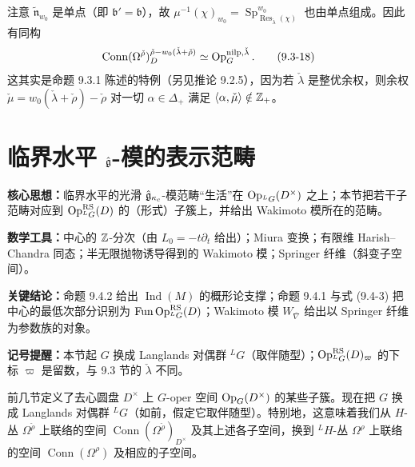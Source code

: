 注意 $\tilde{\mathfrak{n}}_{w_0}$ 是单点（即 $\mathfrak{b}'=\mathfrak{b}$），故 $\mu^{-1}(\chi)_{w_0}=\operatorname{Sp}^{w_0}_{\operatorname{Res}_{\check\lambda}(\chi)}$ 也由单点组成。因此有同构
\begin{equation}
    \operatorname{Conn}(\Omega^{\check\rho})^{\check\rho-w_0(\check\lambda+\check\rho)}_D
    \simeq\operatorname{Op}^{\mathrm{nilp},\check\lambda}_G .
    \tag{9.3-18}
\end{equation}
这其实是命题 9.3.1 陈述的特例（另见推论 9.2.5），因为若 $\check\lambda$ 是整优余权，则余权 $\check\mu=w_0(\check\lambda+\check\rho)-\check\rho$ 对一切 $\alpha\in\Delta_+$ 满足 $\langle\alpha,\check\mu\rangle\notin\mathbb{Z}_+$。


\section{临界水平 $\hat{\mathfrak{g}}$-模的表示范畴}

\begin{keypoints}
    \item \textbf{核心思想：}临界水平的光滑 $\hat{\mathfrak{g}}_{\kappa_c}$-模范畴“生活”在 $\operatorname{Op}_{{}^LG}(D^\times)$ 之上；本节把若干子范畴对应到 $\operatorname{Op}^{\mathrm{RS}}_{{}^LG}(D)$ 的（形式）子簇上，并给出 Wakimoto 模所在的范畴。
    \item \textbf{数学工具：}中心的 $\mathbb{Z}$-分次（由 $L_0=-t\partial_t$ 给出）；Miura 变换；有限维 Harish--Chandra 同态；半无限抛物诱导得到的 Wakimoto 模；Springer 纤维（斜变子空间）。
    \item \textbf{关键结论：}命题 9.4.2 给出 $\operatorname{Ind}(M)$ 的概形论支撑；命题 9.4.1 与式 (9.4-3) 把中心的最低次部分识别为 $\operatorname{Fun}\operatorname{Op}^{\mathrm{RS}}_{{}^LG}(D)$；Wakimoto 模 $W_{\overline{\nabla}}$ 给出以 Springer 纤维为参数族的对象。
    \item \textbf{记号提醒：}本节起 $G$ 换成 Langlands 对偶群 ${}^LG$（取伴随型）；$\operatorname{Op}^{\mathrm{RS}}_{{}^LG}(D)_\varpi$ 的下标 $\varpi$ 是留数，与 9.3 节的 $\check\lambda$ 不同。
\end{keypoints}

前几节定义了去心圆盘 $D^\times$ 上 $G$-oper 空间 $\operatorname{Op}_G(D^\times)$ 的某些子簇。现在把 $G$ 换成 Langlands 对偶群 ${}^LG$（如前，假定它取伴随型）。特别地，这意味着我们从 $H$-丛 $\Omega^{\check\rho}$ 上联络的空间 $\operatorname{Conn}(\Omega^{\check\rho})_{D^\times}$ 及其上述各子空间，换到 ${}^LH$-丛 $\Omega^\rho$ 上联络的空间 $\operatorname{Conn}(\Omega^\rho)$ 及相应的子空间。

